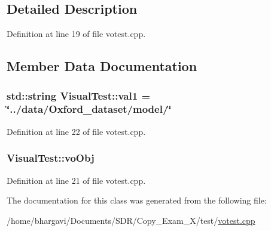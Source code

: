 \subsection{Detailed Description}


Definition at line 19 of file votest.\+cpp.



\subsection{Member Data Documentation}
\subsubsection[{\texorpdfstring{val1}{val1}}]{\setlength{\rightskip}{0pt plus 5cm}std\+::string Visual\+Test\+::val1 = \char`\"{}../data/Oxford\+\_\+dataset/model/\char`\"{}\hspace{0.3cm}{\ttfamily [protected]}}\hypertarget{class_visual_test_add48da25b6995fd1442424f779a777d1}{}\label{class_visual_test_add48da25b6995fd1442424f779a777d1}


Definition at line 22 of file votest.\+cpp.

\subsubsection[{\texorpdfstring{vo\+Obj}{voObj}}]{ Visual\+Test\+::vo\+Obj\hspace{0.3cm}{\ttfamily [protected]}}\hypertarget{class_visual_test_ada2ac3c1ec41626761106d66c768ee19}{}\label{class_visual_test_ada2ac3c1ec41626761106d66c768ee19}


Definition at line 21 of file votest.\+cpp.



The documentation for this class was generated from the following file\+:\begin{DoxyCompactItemize}
\item 
/home/bhargavi/\+Documents/\+S\+D\+R/\+Copy\+\_\+\+Exam\+\_\+X/test/\hyperlink{votest_8cpp}{votest.\+cpp}\end{DoxyCompactItemize}
